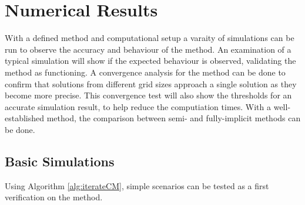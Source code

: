 \section{Numerical Results}

  With a defined method and computational setup a varaity of simulations can be run to observe the accuracy and behaviour of the method.
  An examination of a typical simulation will show if the expected behaviour is observed, validating the method as functioning.
  A convergence analysis for the method can be done to confirm that solutions from different grid sizes approach a single solution as they become more precise.
  This convergence test will also show the thresholds for an accurate simulation result, to help reduce the computiation times.
  With a well-established method, the comparison between semi- and fully-implicit methods can be done.

\subsection{Basic Simulations}

  Using Algorithm \ref{alg:iterateCM}, simple scenarios can be tested as a first verification on the method.

  

